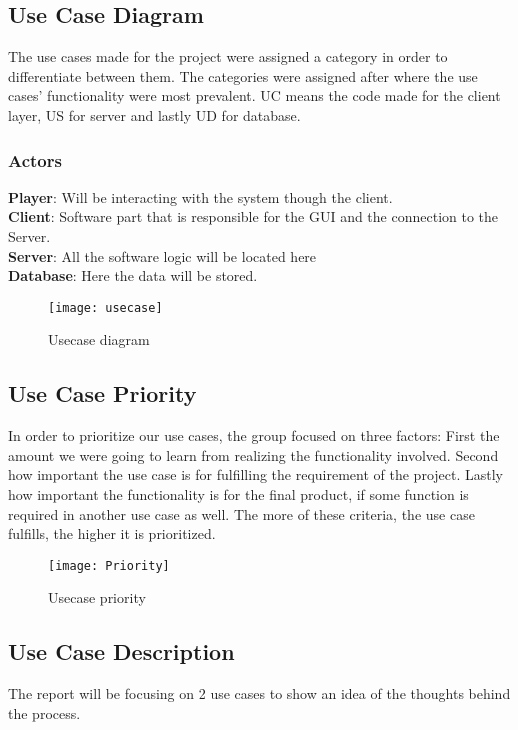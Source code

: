 \subsection{Use Case Diagram}

The use cases made for the project were assigned a category in order to
 differentiate between them. The categories were assigned after where the
  use cases’ functionality were most prevalent. UC means the code made for
   the client layer, US for server and lastly UD for database.

\subsubsection{Actors}

\textbf{Player}: Will be interacting with the system though the client.\\
\textbf{Client}: Software part that is responsible for the GUI and the connection
 to the Server. \\
\textbf{Server}: All the software logic will be located here\\
\textbf{Database}: Here the data will be stored.

\begin{figure}[h]
\centering
\texttt{[image: usecase]}
\caption{Usecase diagram}
\end{figure}
\clearpage

\subsection{Use Case Priority}

In order to prioritize our use cases, the group focused on three factors:
 First the amount we were going to learn from realizing the functionality
  involved. Second how important the use case is for fulfilling the
   requirement of the project. Lastly how important the functionality
    is for the final product, if some function is required in another
     use case as well. The more of these criteria, the use case fulfills,
      the higher it is prioritized.

\begin{figure}[h]
\centering
\texttt{[image: Priority]}
\caption{Usecase priority}
\end{figure}
\newpage
\subsection{Use Case Description}
The report will be focusing on 2 use cases to show an idea of the thoughts
 behind the process.

